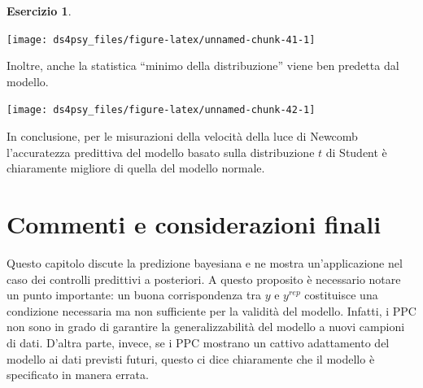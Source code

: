 \documentclass[
  11pt,
]{krantz}
\makeatletter
\newenvironment{Shaded}{\begin{snugshade}}{\end{snugshade}}
\newcommand{\AttributeTok}[1]{\textcolor[rgb]{0.61,0.61,0.61}{#1}}
\newcommand{\FunctionTok}[1]{\textcolor[rgb]{0,0,0}{#1}}
\newcommand{\NormalTok}[1]{#1}
\newcommand{\SpecialCharTok}[1]{\textcolor[rgb]{0,0,0}{#1}}
\newcommand{\StringTok}[1]{\textcolor[rgb]{0.5,0.5,0.5}{#1}}
\newenvironment{kframe}{%
\medskip{}
\setlength{\fboxsep}{.8em}
 \def\at@end@of@kframe{}%
 \ifinner\ifhmode%
  \def\at@end@of@kframe{\end{minipage}}%
  \begin{minipage}{\columnwidth}%
 \fi\fi%
 \def\FrameCommand##1{\hskip\@totalleftmargin \hskip-\fboxsep
 \colorbox{shadecolor}{##1}\hskip-\fboxsep
     \hskip-\linewidth \hskip-\@totalleftmargin \hskip\columnwidth}%
 \MakeFramed {\advance\hsize-\width
   \@totalleftmargin\z@ \linewidth\hsize
   \@setminipage}}%
 {\par\unskip\endMakeFramed%
 \at@end@of@kframe}
\renewenvironment{Shaded}{\begin{kframe}}{\end{kframe}}
\theoremstyle{definition}
\theoremstyle{definition}
\theoremstyle{definition}
\newtheorem{exercise}{Esercizio}[chapter]
\theoremstyle{definition}
\theoremstyle{remark}
\makeatother
\begin{document}
\begin{exercise}
\begin{center}\texttt{[image: ds4psy\_files/figure-latex/unnamed-chunk-41-1]} \end{center}

Inoltre, anche la statistica ``minimo della distribuzione'' viene ben predetta dal modello.

\begin{Shaded}
\end{Shaded}

\begin{center}\texttt{[image: ds4psy\_files/figure-latex/unnamed-chunk-42-1]} \end{center}

In conclusione, per le misurazioni della velocità della luce di Newcomb l'accuratezza predittiva del modello basato sulla distribuzione \(t\) di Student è chiaramente migliore di quella del modello normale.
\end{exercise}

\hypertarget{commenti-e-considerazioni-finali-1}{%
\section*{Commenti e considerazioni finali}\label{commenti-e-considerazioni-finali-1}}


Questo capitolo discute la predizione bayesiana e ne mostra un'applicazione nel caso dei controlli predittivi a posteriori. A questo proposito è necessario notare un punto importante: un buona corrispondenza tra \(y\) e \(y^{rep}\) costituisce una condizione necessaria ma non sufficiente per la validità del modello. Infatti, i PPC non sono in grado di garantire la generalizzabilità del modello a nuovi campioni di dati. D'altra parte, invece, se i PPC mostrano un cattivo adattamento del modello ai dati previsti futuri, questo ci dice chiaramente che il modello è specificato in manera errata.

  

\printindex
\end{document}
